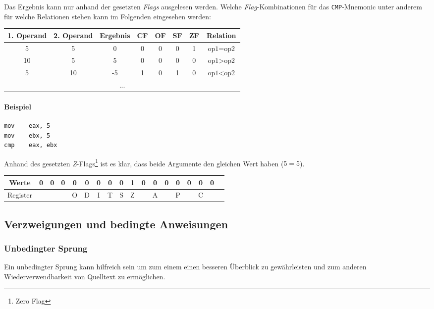 Das Ergebnis kann nur anhand der gesetzten \textit{Flags} ausgelesen werden.
Welche \textit{Flag}-Kombinationen für das \texttt{CMP}-Mnemonic unter anderem für welche Relationen stehen kann im Folgenden eingesehen werden:

\begin{tabular}{|c|c|c|c|c|c|c|c|}
\hline
1. Operand & 2. Operand & Ergebnis & 
CF & 
OF & 
SF &
ZF
& Relation \\ \hline 
5          & 5          & 0        & 0  & 0  & 0  & 1  & $\text{op1} = \text{op2}$ \\ \hline
10         & 5          & 5        & 0  & 0  & 0  & 0  & $\text{op1} > \text{op2}$ \\ \hline
5          & 10         & -5       & 1  & 0  & 1  & 0  & $\text{op1} < \text{op2}$ \\ \hline
\multicolumn{8}{|c|}{...} \\ \hline
\end{tabular}

\paragraph{Beispiel\newline}
\makebox{}
\begin{lstlisting}
mov    eax, 5
mov    ebx, 5
cmp    eax, ebx
\end{lstlisting}

Anhand des gesetzten \textit{Z}-Flags\footnote{Zero Flag} ist es klar, dass beide Argumente den gleichen Wert haben ($5 = 5$). 
 
\begin{tabular}{|c|c|c|c|c|c|c|c|c|c|c|c|c|c|c|c|c|c|}
\hline Werte & 0 & 0 & 0 & 0 & 0 & 0 & 0 & 0 & 1 & 0 & 0 & 0 & 0 & 0 & 0 & 0 \\
\hline Register & & & & O & D & I & T & S & Z & & A & & P & & C & \\
\hline
\end{tabular}

\subsection{Verzweigungen und bedingte Anweisungen}

\subsubsection{Unbedingter Sprung}
Ein unbedingter Sprung kann hilfreich sein um zum einem einen besseren Überblick zu gewährleisten und zum anderen Wiederverwendbarkeit von Quelltext zu ermöglichen.

